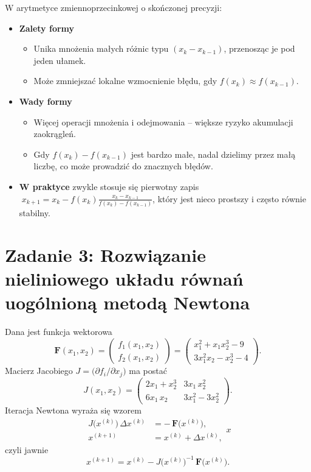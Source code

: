 \documentclass[a4paper,12pt]{article}
\begin{document}
W arytmetyce zmiennoprzecinkowej o skończonej precyzji:

\begin{itemize}
  \item \textbf{Zalety formy}
    \begin{itemize}
      \item Unika mnożenia małych różnic typu \((x_k - x_{k-1})\), przenosząc je pod jeden ułamek.
      \item Może zmniejszać lokalne wzmocnienie błędu, gdy \(f(x_k)\approx f(x_{k-1})\).
    \end{itemize}
  \item \textbf{Wady formy}
    \begin{itemize}
      \item Więcej operacji mnożenia i odejmowania – większe ryzyko akumulacji zaokrągleń.
      \item Gdy \(f(x_k)-f(x_{k-1})\) jest bardzo małe, nadal dzielimy przez małą liczbę, co może prowadzić do znacznych błędów.
    \end{itemize}
  \item \textbf{W praktyce} zwykle stosuje się pierwotny zapis
  \(\;x_{k+1}=x_k - f(x_k)\frac{x_k - x_{k-1}}{f(x_k)-f(x_{k-1})}\),
  który jest nieco prostszy i często równie stabilny.
\end{itemize}

\section*{Zadanie 3: Rozwiązanie nieliniowego układu równań uogólnioną metodą Newtona}

Dana jest funkcja wektorowa
\[
\mathbf{F}(x_1,x_2)
=\begin{pmatrix}
f_1(x_1,x_2)\\[6pt]
f_2(x_1,x_2)
\end{pmatrix}
=
\begin{pmatrix}
x_1^2 + x_1 x_2^3 - 9 \\[4pt]
3x_1^2 x_2 - x_2^3 - 4
\end{pmatrix}.
\]
Macierz Jacobiego \(J = \bigl(\partial f_i/\partial x_j\bigr)\) ma postać
\[
J(x_1,x_2)
=
\begin{pmatrix}
2x_1 + x_2^3 & 3x_1\,x_2^2\\[6pt]
6x_1\,x_2   & 3x_1^2 - 3x_2^2
\end{pmatrix}.
\]
Iteracja Newtona wyraża się wzorem
\[
\begin{aligned}
J\bigl(x^{(k)}\bigr)\,\Delta x^{(k)}
&= -\,\mathbf{F}\bigl(x^{(k)}\bigr),\\
x^{(k+1)} &= x^{(k)} + \Delta x^{(k)},
\end{aligned}x
\]
czyli jawnie
\[
x^{(k+1)}
=
x^{(k)}
- J\bigl(x^{(k)}\bigr)^{-1}\,\mathbf{F}\bigl(x^{(k)}\bigr).
\]
\end{document}
